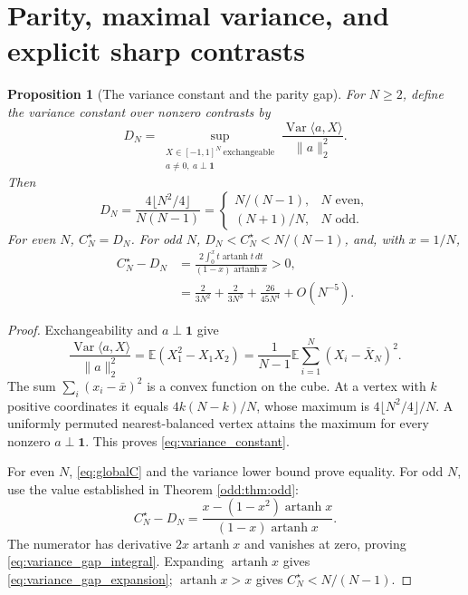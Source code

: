 \documentclass[11pt,a4paper]{article}
\newtheorem{proposition}[theorem]{Proposition}
\DeclareMathOperator{\Var}{Var}\DeclareMathOperator{\Cov}{Cov}\DeclareMathOperator{\Hyp}{Hyp}\DeclareMathOperator{\Bern}{Bern}\DeclareMathOperator{\supp}{supp}\DeclareMathOperator{\artanh}{artanh}
\newcommand{\E}{\mathbb E}\newcommand{\R}{\mathbb R}\newcommand{\N}{\mathbb N}\newcommand{\one}{\mathbf1}
\begin{document}
\section{Parity, maximal variance, and explicit sharp contrasts}\label{sec:parity}
\begin{proposition}[The variance constant and the parity gap]\label{prop:variance_parity}
For $N\ge2$, define the variance constant over nonzero contrasts by
\[
 D_N=\sup_{\substack{X\in[-1,1]^N\ \mathrm{exchangeable}\\a\ne0,\ a\perp\one}}
 \frac{\Var\langle a,X\rangle}{\|a\|_2^2}.
\]
Then
\begin{equation}\label{eq:variance_constant}
 D_N=\frac{4\lfloor N^2/4\rfloor}{N(N-1)}
 =\begin{cases}N/(N-1),&N\text{ even},\\(N+1)/N,&N\text{ odd}.
 \end{cases}
\end{equation}
For even $N$, $C_N^\star=D_N$. For odd $N$, $D_N<C_N^\star<N/(N-1)$, and, with $x=1/N$,
\begin{align}
 C_N^\star-D_N
 &=\frac{2\int_0^x t\operatorname{artanh}t\,dt}
 {(1-x)\operatorname{artanh}x}>0,\label{eq:variance_gap_integral}\\
 &=\frac{2}{3N^2}+\frac{2}{3N^3}+\frac{26}{45N^4}+O(N^{-5}).\label{eq:variance_gap_expansion}
\end{align}
\end{proposition}
\begin{proof}
Exchangeability and $a\perp\one$ give
\[
 \frac{\Var\langle a,X\rangle}{\|a\|_2^2}
 =\E(X_1^2-X_1X_2)
 =\frac1{N-1}\E\sum_{i=1}^N(X_i-\bar X_N)^2.
\]
The sum $\sum_i(x_i-\bar x)^2$ is a convex function on the cube. At a vertex with $k$ positive coordinates it equals $4k(N-k)/N$, whose maximum is $4\lfloor N^2/4\rfloor/N$. A uniformly permuted nearest-balanced vertex attains the maximum for every nonzero $a\perp\one$. This proves \eqref{eq:variance_constant}.

For even $N$, \eqref{eq:globalC} and the variance lower bound prove equality. For odd $N$, use the value established in Theorem \ref{odd:thm:odd}:
\[
 C_N^\star-D_N
 =\frac{x-(1-x^2)\operatorname{artanh}x}
 {(1-x)\operatorname{artanh}x}.
\]
The numerator has derivative $2x\operatorname{artanh}x$ and vanishes at zero, proving \eqref{eq:variance_gap_integral}. Expanding $\operatorname{artanh}x$ gives \eqref{eq:variance_gap_expansion}; $\operatorname{artanh}x>x$ gives $C_N^\star<N/(N-1)$.
\end{proof}
\end{document}
